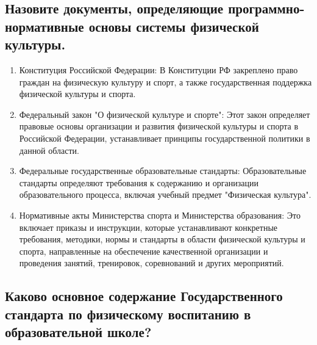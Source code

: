 \subsection{Назовите документы, определяющие программно-нормативные основы системы физической культуры.}

\begin{enumerate}
    \item Конституция Российской Федерации: В Конституции РФ закреплено право граждан на физическую культуру и спорт, а также государственная поддержка физической культуры и спорта.
    \item Федеральный закон "О физической культуре и спорте": Этот закон определяет правовые основы организации и развития физической культуры и спорта в Российской Федерации, устанавливает принципы государственной политики в данной области.
    \item Федеральные государственные образовательные стандарты: Образовательные стандарты определяют требования к содержанию и организации образовательного процесса, включая учебный предмет "Физическая культура".
    \item Нормативные акты Министерства спорта и Министерства образования: Это включает приказы и инструкции, которые устанавливают конкретные требования, методики, нормы и стандарты в области физической культуры и спорта, направленные на обеспечение качественной организации и проведения занятий, тренировок, соревнований и других мероприятий.
\end{enumerate}

\subsection{Каково основное содержание Государственного стандарта по физическому воспитанию в образовательной школе?}

